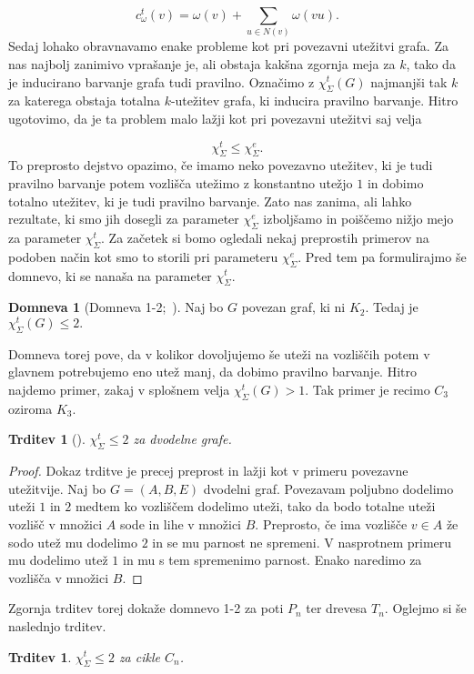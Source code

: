 \documentclass[12pt,a4paper,twoside]{article}
\theoremstyle{definition} %
\newtheorem{domneva}[definicija]{Domneva}
\theoremstyle{plain} %
\newtheorem{trditev}[definicija]{Trditev}
\newcommand{\ec}{\chi_{\Sigma}^e}
\newcommand{\ect}{\chi_{\Sigma}^t}
\numberwithin{equation}{section}  %
\begin{document}
$$c_{\omega}^t(v)  = \omega(v) +  \sum_{u \in N(v)} \omega(vu).$$
Sedaj lohako obravnavamo enake probleme kot pri povezavni utežitvi grafa. Za nas najbolj zanimivo vprašanje je, ali obstaja kakšna zgornja meja za $k$, tako da je inducirano barvanje grafa tudi pravilno. Označimo z $\ect(G)$ najmanjši tak $k$ za katerega obstaja totalna $k$-utežitev grafa, ki inducira pravilno barvanje. Hitro ugotovimo, da je ta problem malo lažji kot pri povezavni utežitvi saj velja

$$ \ect \le \ec. $$
To preprosto dejstvo opazimo, če imamo neko povezavno utežitev, ki je tudi pravilno barvanje potem vozlišča utežimo z konstantno utežjo $1$ in dobimo totalno utežitev, ki je tudi pravilno barvanje. Zato nas zanima, ali lahko rezultate, ki smo jih dosegli za parameter $\ec$ izboljšamo in poiščemo nižjo mejo za parameter $\ect$.
Za začetek si bomo ogledali nekaj preprostih primerov na podoben način kot smo to storili pri parameteru $\ec$. Pred tem pa formulirajmo še domnevo, ki se nanaša na parameter $\ect$.
\begin{domneva} [Domneva 1-2;~\citet{12conj}]
	\label{12conjecture}
	Naj bo $G$ povezan graf, ki ni $K_2$. Tedaj je $\ect(G) \le 2.$ 
\end{domneva}
Domneva torej pove, da v kolikor dovoljujemo še uteži na vozliščih potem v glavnem potrebujemo eno utež manj, da dobimo pravilno barvanje. Hitro najdemo primer, zakaj v splošnem velja $\ect(G) > 1$. Tak primer je recimo $C_3$ oziroma $K_3$.
\begin{trditev}[\citet{12conj}]
$\ect \le 2$ za dvodelne grafe.
\end{trditev}
\begin{proof}
Dokaz trditve je precej preprost in lažji kot v primeru povezavne utežitvije. Naj bo $G = (A,B, E)$ dvodelni graf. Povezavam  poljubno dodelimo uteži $1$ in $2$ medtem ko vozliščem dodelimo uteži, tako da bodo totalne uteži vozlišč v množici $A$ sode in lihe v množici $B$. Preprosto, če ima vozlišče $v \in A$ že sodo utež mu dodelimo $2$ in se mu parnost ne spremeni. V nasprotnem primeru mu dodelimo utež $1$ in mu s tem spremenimo parnost. Enako naredimo za vozlišča v množici $B$.
\end{proof}
Zgornja trditev torej dokaže domnevo 1-2 za poti $P_n$ ter drevesa $T_n$. Oglejmo si še naslednjo trditev.
\begin{trditev}
$\ect \le 2$ za cikle $C_n$.
\end{trditev}
\end{document}
